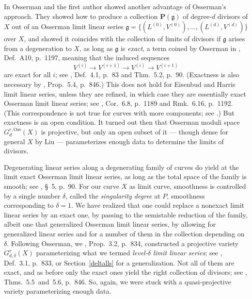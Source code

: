 \documentclass[a4paper,11pt]{amsart}
\theoremstyle{plain}
\theoremstyle{definition}
\theoremstyle{remark}
\begin{document}
In \cite{E-Oss} Osserman and the first author showed another advantage of Osserman's approach. They showed how to produce a collection $\mathbf P(\mathfrak g)$ of degree-$d$ divisors of $X$ out of an Osserman limit linear series $\mathfrak g=\{(L^{(0)},V^{(0)}),\dots,(L^{(d)},V^{(d)})\}$ over $X$, and showed it coincides with the collection of limits of divisors if $\mathfrak g$ arises from a degeneration to $X$, as long as $\mathfrak g$ is \emph{exact}, a term coined by Osserman in \cite{Oss1}, Def.~A10, p.~1197, meaning that the induced sequences 
$$
V^{(i)}\to V^{(i+1)}\to V^{(i)}\to V^{(i+1)}
$$
are exact for all $i$; see \cite{E-Oss}, Def.~4.1, p.~83 and Thm.~5.2, p.~90. (Exactness is also necessary by \cite{ENR}, Prop.~5.4, p.~846.)
This does not hold for Eisenbud and Harris limit linear series, unless they are refined, in which case they are essentially exact Osserman limit linear series; see \cite{Oss1}, Cor.~6.8, p.~1189 and Rmk.~6.16, p.~1192. (This correspondence is not true for curves with more components; see \cite{M}.) But exactness is an open condition. It turned out then that Osserman moduli space $G^{r,\text{Oss}}_d(X)$ is projective, but only an open subset of it --- though dense for general $X$ by Liu \cite{Liu} --- parameterizes enough data to determine the limits of divisors.

Degenerating linear series along a degenerating family of curves do yield at the limit exact Osserman limit linear series, as long as the total space of the family is smooth; see \cite{E-Oss}, \S~5, p.~90. For our curve $X$ as limit curve, smoothness is controlled by a single number $\delta$, called the \emph{singularity degree} at $P$, smoothness corresponding to $\delta=1$. We \cite{ENR} have realized that one could replace a nonexact limit linear series by an exact one, by passing to the semistable reduction of the family, albeit one that generalized Osserman limit linear series, by allowing for generalized linear series and for a number of them in the collection depending on $\delta$. Following Osserman, we \cite{ENR}, Prop.~3.2, p.~834, constructed a projective variety $G^r_{d,\delta}(X)$ parameterizing what we termed \emph{level-$\delta$ limit linear series}; see \cite{ENR}, Def.~3.1, p.~833, or Section~\ref{deltalls} for a generalization. Not all of them are exact, and as before only the exact ones yield the right collection of divisors; see \cite{ENR}, Thms.~5.5~and~5.6, p.~846. So, again, we were stuck with a quasi-projective variety parameterizing enough data.
\end{document}
